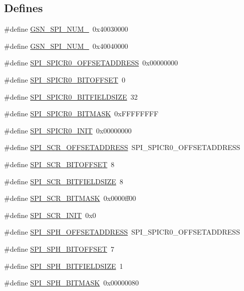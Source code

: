 \subsection*{Defines}
\begin{DoxyCompactItemize}
\item 
\#define \hyperlink{a00573_aea5d7602e4be8541bc8df74dd619bc7b}{GSN\_\-SPI\_\-NUM\_}~0x40030000
\item 
\#define \hyperlink{a00573_a541265993fecdde13c3815c2cfce00d8}{GSN\_\-SPI\_\-NUM\_}~0x40040000
\item 
\#define \hyperlink{a00573_ae87c9ffa29bfbf61db94992470165ed3}{SPI\_\-SPICR0\_\-OFFSETADDRESS}~0x00000000
\item 
\#define \hyperlink{a00573_a9cacf32f81824e9d822bb3390aa19a0f}{SPI\_\-SPICR0\_\-BITOFFSET}~0
\item 
\#define \hyperlink{a00573_ab7d428619c0ccdc3925ad97544a53bdf}{SPI\_\-SPICR0\_\-BITFIELDSIZE}~32
\item 
\#define \hyperlink{a00573_ae23457b72791ce11590a9508deb50279}{SPI\_\-SPICR0\_\-BITMASK}~0xFFFFFFFF
\item 
\#define \hyperlink{a00573_a9bc418fd6f049519c12a9ca025a7e1e4}{SPI\_\-SPICR0\_\-INIT}~0x00000000
\item 
\#define \hyperlink{a00573_a470e780a538c1454dd736ac01cf610bc}{SPI\_\-SCR\_\-OFFSETADDRESS}~SPI\_\-SPICR0\_\-OFFSETADDRESS
\item 
\#define \hyperlink{a00573_ad72d2de8f2f7eba1a9dd20711243d5d3}{SPI\_\-SCR\_\-BITOFFSET}~8
\item 
\#define \hyperlink{a00573_a618929caf3a02fac794ddcdda362078f}{SPI\_\-SCR\_\-BITFIELDSIZE}~8
\item 
\#define \hyperlink{a00573_a3bfd772fdcc3bc01e79701d5bfe75d59}{SPI\_\-SCR\_\-BITMASK}~0x0000ff00
\item 
\#define \hyperlink{a00573_a960fc9adfb8e83c5541a9ed076d5a5f0}{SPI\_\-SCR\_\-INIT}~0x0
\item 
\#define \hyperlink{a00573_a3d03a24de66d9d7c1a2c2a3e8a8c51a2}{SPI\_\-SPH\_\-OFFSETADDRESS}~SPI\_\-SPICR0\_\-OFFSETADDRESS
\item 
\#define \hyperlink{a00573_a029a19f64a485ace0d83faf36ef2166e}{SPI\_\-SPH\_\-BITOFFSET}~7
\item 
\#define \hyperlink{a00573_a3f91a0357ac087d592b9bc795d07fb99}{SPI\_\-SPH\_\-BITFIELDSIZE}~1
\item 
\#define \hyperlink{a00573_ad89722a0f921d33192794b846a42448d}{SPI\_\-SPH\_\-BITMASK}~0x00000080
\item 

\end{DoxyCompactItemize}
